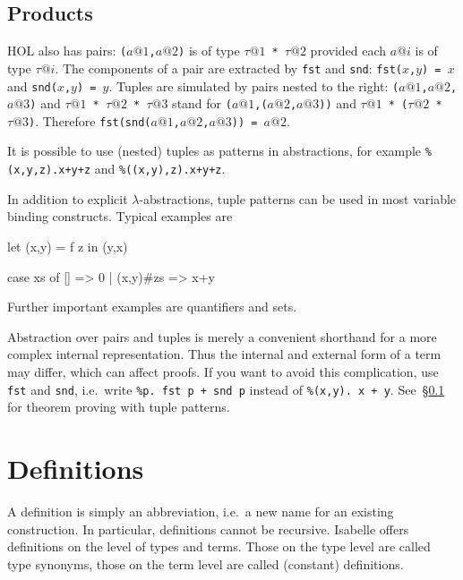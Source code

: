 

\subsection{Products}

HOL also has pairs: \texttt{($a@1$,$a@2$)} is of type \texttt{$\tau@1$ *
$\tau@2$} provided each $a@i$ is of type $\tau@i$. The components of a pair
are extracted by \texttt{fst} and \texttt{snd}:
\texttt{fst($x$,$y$) = $x$} and \texttt{snd($x$,$y$) = $y$}. Tuples
are simulated by pairs nested to the right: 
\texttt{($a@1$,$a@2$,$a@3$)} and \texttt{$\tau@1$ * $\tau@2$ * $\tau@3$}
stand for \texttt{($a@1$,($a@2$,$a@3$))} and \texttt{$\tau@1$ * ($\tau@2$ *
$\tau@3$)}. Therefore \texttt{fst(snd($a@1$,$a@2$,$a@3$)) = $a@2$}.

It is possible to use (nested) tuples as patterns in abstractions, for
example \texttt{\%(x,y,z).x+y+z} and \texttt{\%((x,y),z).x+y+z}.

In addition to explicit $\lambda$-abstractions, tuple patterns can be used in
most variable binding constructs. Typical examples are
\begin{ttbox}
let (x,y) = f z in (y,x)

case xs of [] => 0 | (x,y)\#zs => x+y
\end{ttbox}
Further important examples are quantifiers and sets.

\begin{warn}
Abstraction over pairs and tuples is merely a convenient shorthand for a more
complex internal representation.  Thus the internal and external form of a
term may differ, which can affect proofs. If you want to avoid this
complication, use \texttt{fst} and \texttt{snd}, i.e.\ write
\texttt{\%p.~fst p + snd p} instead of \texttt{\%(x,y).~x + y}.
See~\S\ref{} for theorem proving with tuple patterns.
\end{warn}


\section{Definitions}
\label{sec:Definitions}

A definition is simply an abbreviation, i.e.\ a new name for an existing
construction. In particular, definitions cannot be recursive. Isabelle offers
definitions on the level of types and terms. Those on the type level are
called type synonyms, those on the term level are called (constant)
definitions.



